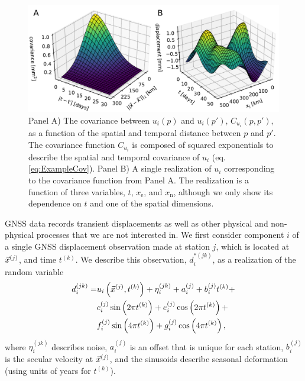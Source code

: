\documentclass[extra,mreferee]{gji}
\begin{document}
\begin{figure}
\includegraphics{figures/prior_demo/prior-demo.pdf}
\caption{ 
Panel A) The covariance between $u_i(p)$ and $u_i(p')$,
$C_{u_i}(p,p')$, as a function of the spatial and temporal distance
between $p$ and $p'$. The covariance function $C_{u_i}$ is composed of
squared exponentials to describe the spatial and temporal covariance
of $u_i$ (eq. \ref{eq:ExampleCov}). Panel B) A single realization of
$u_i$ corresponding to the covariance function from Panel A. The
realization is a function of three variables, $t$, $x_\mathrm{e}$, and
$x_\mathrm{n}$, although we only show its dependence on $t$ and one of
the spatial dimensions.
}    
\label{fig:PriorDemo}
\end{figure}


GNSS data records transient displacements as well as other physical
and non-physical processes that we are not interested in. We first
consider component $i$ of a single GNSS displacement observation made
at station $j$, which is located at $\vec{x}^{(j)}$, and time $t^{(k)}$.
We describe this observation, $d_i^{*(jk)}$, as a realization of the
random variable
\begin{align}\label{eq:Data}
\begin{split}
d_i^{(jk)} = &u_i\left(\vec{x}^{(j)},t^{(k)}\right) + 
              \eta_i^{(jk)} + 
              a_i^{(j)} + b_i^{(j)}t^{(k)} + \\
             &c_i^{(j)}\sin\left(2 \pi t^{(k)}\right) +  
              e_i^{(j)}\cos\left(2 \pi t^{(k)}\right) + \\ 
             &f_i^{(j)}\sin\left(4 \pi t^{(k)}\right)  + 
              g_i^{(j)}\cos\left(4 \pi t^{(k)}\right), 
\end{split}
\end{align}
where $\eta_i^{(jk)}$ describes noise, $a_i^{(j)}$ is an offset that
is unique for each station, $b_i^{(j)}$ is the secular velocity at
$\vec{x}^{(j)}$, and the sinusoids describe seasonal deformation (using
units of years for $t^{(k)}$). 
\end{document}

